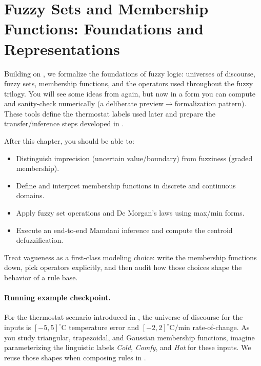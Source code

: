 \section{Fuzzy Sets and Membership Functions: Foundations and Representations}\label{chap:fuzzysets}
\graphicspath{{assets/lec9/}{assets/lec16/}}

\noindent Building on , we formalize the foundations of fuzzy logic: universes of discourse, fuzzy sets, membership functions, and the operators used throughout the fuzzy trilogy. You will see some ideas from  again, but now in a form you can compute and sanity-check numerically (a deliberate preview\(\rightarrow\)formalization pattern). These tools define the thermostat labels used later and prepare the transfer/inference steps developed in .

\begin{tcolorbox}[summarybox, title={Learning Outcomes}]
After this chapter, you should be able to:
\begin{itemize}
  \item Distinguish imprecision (uncertain value/boundary) from fuzziness (graded membership).
  \item Define and interpret membership functions in discrete and continuous domains.
  \item Apply fuzzy set operations and De Morgan's laws using max/min forms.
  \item Execute an end-to-end Mamdani inference and compute the centroid defuzzification.
\end{itemize}
\end{tcolorbox}

\begin{tcolorbox}[summarybox, title={Design motif}]
Treat vagueness as a first-class modeling choice: write the membership functions down, pick operators explicitly, and then audit how those choices shape the behavior of a rule base.
\end{tcolorbox}

\paragraph{Running example checkpoint.}
For the thermostat scenario introduced in , the universe of discourse for the inputs is \([-5,5]^\circ\text{C}\) temperature error and \([-2,2]^\circ\text{C}/\text{min}\) rate-of-change. As you study triangular, trapezoidal, and Gaussian membership functions, imagine parameterizing the linguistic labels \textit{Cold}, \textit{Comfy}, and \textit{Hot} for these inputs. We reuse those shapes when composing rules in .

